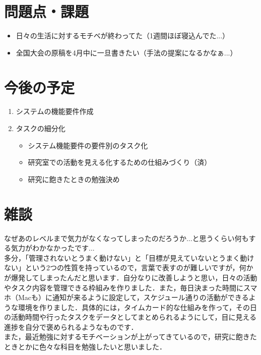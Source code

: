 \documentclass[a4paper,12pt]{ltjsarticle}
\begin{document}
\section{問題点・課題}
\begin{itemize}
  \item 日々の生活に対するモチベが終わってた（1週間ほぼ寝込んでた...）
  \item 全国大会の原稿を4月中に一旦書きたい（手法の提案になるかなぁ...）
\end{itemize}

\section{今後の予定}
\begin{enumerate}
  \item システムの機能要件作成
  \item タスクの細分化
  \begin{itemize}
    \item システム機能要件の要件別のタスク化
    \item 研究室での活動を見える化するための仕組みづくり（済）
    \item 研究に飽きたときの勉強決め
  \end{itemize}
\end{enumerate}
\newpage

\section*{雑談}
なぜあのレベルまで気力がなくなってしまったのだろうか...と思うくらい何もする気力がわかなかったです...\\

多分，「管理されないとうまく動けない」と「目標が見えていないとうまく動けない」という2つの性質を持っているので，言葉で表すのが難しいですが，何かが爆発してしまったんだと思います．自分なりに改善しようと思い，日々の活動やタスク内容を管理できる枠組みを作りました．また，毎日決まった時間にスマホ（Macも）に通知が来るように設定して，スケジュール通りの活動ができるような環境を作りました．具体的には，タイムカード的な仕組みを作って，その日の活動時間や行ったタスクをデータとしてまとめられるようにして，目に見える進捗を自分で褒められるようなものです．\\

また，最近勉強に対するモチベーションが上がってきているので，研究に飽きたときとかに色々な科目を勉強したいと思いました．
\end{document}
